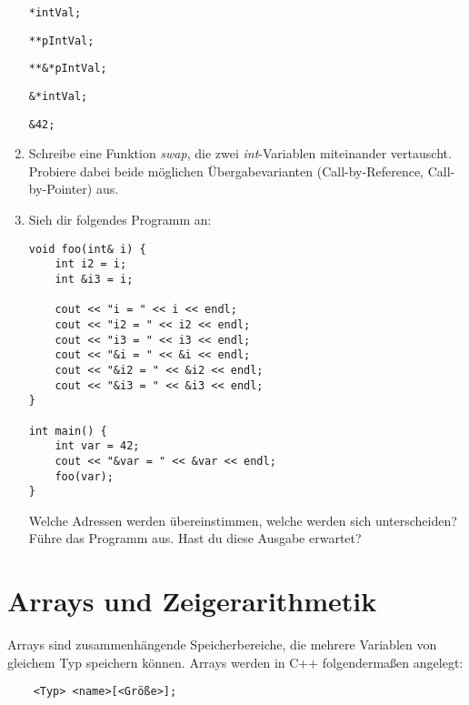 \begin{enumerate}
\begin{lstlisting}
*intVal;
\end{lstlisting}

\begin{lstlisting}
**pIntVal;
\end{lstlisting}

\begin{lstlisting}
**&*pIntVal;
\end{lstlisting}

\begin{lstlisting}
&*intVal;
\end{lstlisting}

\begin{lstlisting}
&42;
\end{lstlisting}

\item Schreibe eine Funktion \emph{swap}, die zwei \emph{int}-Variablen miteinander vertauscht. 
Probiere dabei beide möglichen Übergabevarianten (Call-by-Reference, Call-by-Pointer) aus. 

\item Sieh dir folgendes Programm an:

\begin{minipage}{\textwidth}
\begin{lstlisting}
void foo(int& i) {
	int i2 = i;
	int &i3 = i;
	
	cout << "i = " << i << endl;
	cout << "i2 = " << i2 << endl;
	cout << "i3 = " << i3 << endl;
	cout << "&i = " << &i << endl;
	cout << "&i2 = " << &i2 << endl;
	cout << "&i3 = " << &i3 << endl;
}

int main() {
	int var = 42;
	cout << "&var = " << &var << endl;
	foo(var);
}
\end{lstlisting}
\end{minipage}

Welche Adressen werden übereinstimmen, welche werden sich unterscheiden?
Führe das Programm aus.
Hast du diese Ausgabe erwartet?

\end{enumerate}

\section{Arrays und Zeigerarithmetik}
Arrays sind zusammenhängende Speicherbereiche, die mehrere Variablen von gleichem Typ speichern können.
Arrays werden in C++ folgendermaßen angelegt:

\begin{lstlisting}
	<Typ> <name>[<Größe>];
\end{lstlisting}

